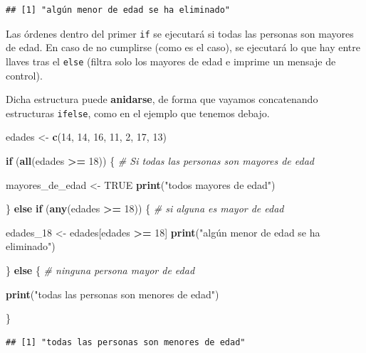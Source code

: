 \documentclass[11pt,]{book}
\newenvironment{Shaded}{\begin{snugshade}}{\end{snugshade}}
\newcommand{\CommentTok}[1]{\textcolor[rgb]{0.37,0.37,0.37}{\textit{#1}}}
\newcommand{\ControlFlowTok}[1]{\textcolor[rgb]{0.27,0.27,0.27}{\textbf{#1}}}
\newcommand{\DecValTok}[1]{\textcolor[rgb]{0.06,0.06,0.06}{#1}}
\newcommand{\KeywordTok}[1]{\textcolor[rgb]{0.27,0.27,0.27}{\textbf{#1}}}
\newcommand{\NormalTok}[1]{#1}
\newcommand{\OperatorTok}[1]{\textcolor[rgb]{0.43,0.43,0.43}{\textbf{#1}}}
\newcommand{\OtherTok}[1]{\textcolor[rgb]{0.37,0.37,0.37}{#1}}
\newcommand{\StringTok}[1]{\textcolor[rgb]{0.5,0.5,0.5}{#1}}
\begin{document}
\begin{verbatim}
## [1] "algún menor de edad se ha eliminado"
\end{verbatim}

Las órdenes dentro del primer \texttt{if} se ejecutará si todas las personas son mayores de edad. En caso de no cumplirse (como es el caso), se ejecutará lo que hay entre llaves tras el \texttt{else} (filtra solo los mayores de edad e imprime un mensaje de control).

Dicha estructura puede \textbf{anidarse}, de forma que vayamos concatenando estructuras \texttt{ifelse}, como en el ejemplo que tenemos debajo.

\begin{Shaded}
\begin{Highlighting}[]
\NormalTok{edades <-}\StringTok{ }\KeywordTok{c}\NormalTok{(}\DecValTok{14}\NormalTok{, }\DecValTok{14}\NormalTok{, }\DecValTok{16}\NormalTok{, }\DecValTok{11}\NormalTok{, }\DecValTok{2}\NormalTok{, }\DecValTok{17}\NormalTok{, }\DecValTok{13}\NormalTok{)}

\ControlFlowTok{if}\NormalTok{ (}\KeywordTok{all}\NormalTok{(edades }\OperatorTok{>=}\StringTok{ }\DecValTok{18}\NormalTok{)) \{ }\CommentTok{# Si todas las personas son mayores de edad}
  
\NormalTok{  mayores_de_edad <-}\StringTok{ }\OtherTok{TRUE}
  \KeywordTok{print}\NormalTok{(}\StringTok{"todos mayores de edad"}\NormalTok{)}
  
\NormalTok{\} }\ControlFlowTok{else} \ControlFlowTok{if}\NormalTok{ (}\KeywordTok{any}\NormalTok{(edades }\OperatorTok{>=}\StringTok{ }\DecValTok{18}\NormalTok{)) \{ }\CommentTok{# si alguna es mayor de edad}

\NormalTok{  edades_}\DecValTok{18}\NormalTok{ <-}\StringTok{ }\NormalTok{edades[edades }\OperatorTok{>=}\StringTok{ }\DecValTok{18}\NormalTok{]  }
  \KeywordTok{print}\NormalTok{(}\StringTok{"algún menor de edad se ha eliminado"}\NormalTok{)}
  
\NormalTok{\} }\ControlFlowTok{else}\NormalTok{ \{ }\CommentTok{# ninguna persona mayor de edad}
  
  \KeywordTok{print}\NormalTok{(}\StringTok{"todas las personas son menores de edad"}\NormalTok{)}
  
\NormalTok{\}}
\end{Highlighting}
\end{Shaded}

\begin{verbatim}
## [1] "todas las personas son menores de edad"
\end{verbatim}
\end{document}
